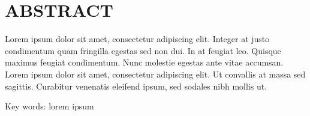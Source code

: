 \clearpage
\chapter*{ABSTRACT}



Lorem ipsum dolor sit amet, consectetur adipiscing elit. Integer at justo condimentum quam fringilla egestas sed non dui. In at feugiat leo. Quisque maximus feugiat condimentum. Nunc molestie egestas ante vitae accumsan. Lorem ipsum dolor sit amet, consectetur adipiscing elit. Ut convallis at massa sed sagittis. Curabitur venenatis eleifend ipsum, sed sodales nibh mollis ut.


\vspace{15mm}
Key words: lorem ipsum

\clearpage
